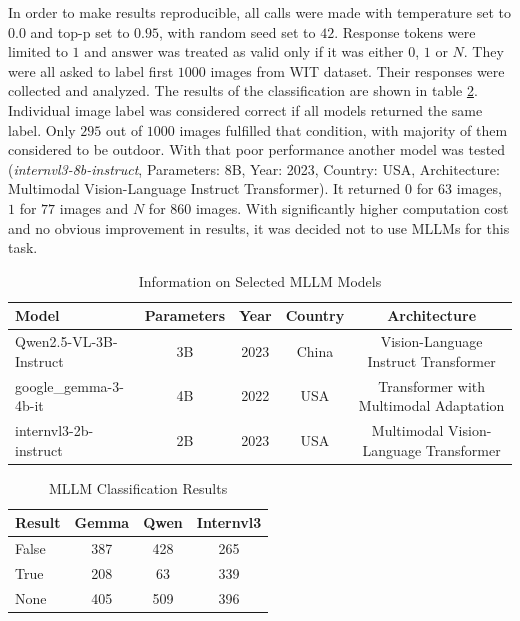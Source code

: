 \documentclass[a4paper]{article}
\begin{document}
In order to make results reproducible, all calls were made with temperature set to $0.0$ and top-p set to $0.95$, with random seed set to $42$. Response tokens were limited to $1$ and answer was treated as valid only if it was either $0$, $1$ or $N$. They were all asked to label first $1000$ images from WIT dataset. Their responses were collected and analyzed. The results of the classification are shown in table \ref{tab:mlm_results}. Individual image label was considered correct if all models returned the same label. Only $295$ out of $1000$ images fulfilled that condition, with majority of them considered to be outdoor. With that poor performance another model was tested (\textit{internvl3-8b-instruct}, Parameters: 8B, Year: 2023, Country: USA, Architecture: Multimodal Vision-Language Instruct Transformer). It returned $0$ for $63$ images, $1$ for $77$ images and $N$ for $860$ images. With significantly higher computation cost and no obvious improvement in results, it was decided not to use MLLMs for this task.

\begin{table}[H]
    \centering
    \caption{Information on Selected MLLM Models}
    \label{tab:mlm_models}
    \begin{tabular}{@{}lcccc@{}}
        \toprule
        \textbf{Model} & \textbf{Parameters} & \textbf{Year} & \textbf{Country} & \textbf{Architecture} \\ \midrule
        Qwen2.5-VL-3B-Instruct    & 3B   & 2023 & China  & Vision-Language Instruct Transformer \\
        google\_gemma-3-4b-it     & 4B   & 2022 & USA    & Transformer with Multimodal Adaptation \\
        internvl3-2b-instruct     & 2B   & 2023 & USA    & Multimodal Vision-Language Transformer \\ \bottomrule
    \end{tabular}
\end{table}

\begin{table}[H]
    \centering
    \caption{MLLM Classification Results}
    \label{tab:mlm_results}
    \begin{tabular}{@{}lccc@{}}
        \toprule
        Result  & Gemma & Qwen & Internvl3 \\ \midrule
        False   & 387   & 428  & 265 \\
        True    & 208   & 63   & 339 \\
        None    & 405   & 509  & 396 \\ \bottomrule
    \end{tabular}
\end{table}
\end{document}

